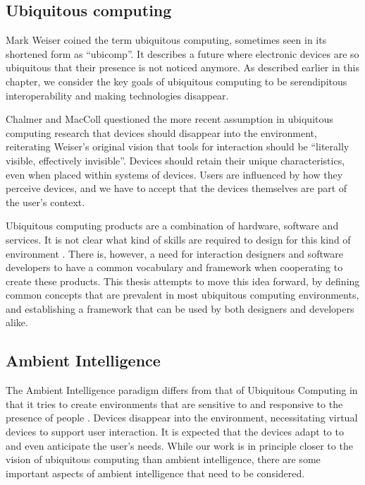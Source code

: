 \subsection{Ubiquitous computing}
 
Mark Weiser \cite{Weiser1991} coined the term ubiquitous computing, sometimes seen in its shortened form as ``ubicomp''. It describes a future where electronic devices are so ubiquitous that their presence is not noticed anymore. As described earlier in this chapter, we consider the key goals of ubiquitous computing to be serendipitous interoperability and making technologies disappear.

Chalmer and MacColl \cite{Chalmers2003} questioned the more recent assumption in ubiquitous computing research that devices should disappear into the environment, reiterating Weiser's original vision that tools for interaction should be ``literally visible, effectively invisible''. Devices should retain their unique characteristics, even when placed within systems of devices. Users are influenced by how they perceive devices, and we have to accept that the devices themselves are part of the user's context.

Ubiquitous computing products are a combination of hardware, software and services. It is not clear what kind of skills are required to design for this kind of environment \cite{Kuniavsky}. There is, however, a need for interaction designers and software developers to have a common vocabulary and framework when cooperating to create these products. This thesis attempts to move this idea forward, by defining common concepts that are prevalent in most ubiquitous computing environments, and establishing a framework that can be used by both designers and developers alike.

\subsection{Ambient Intelligence}
The Ambient Intelligence paradigm differs from that of Ubiquitous Computing in that it tries to create environments that are sensitive  to and responsive to the presence of people \cite{Aarts2004}. Devices disappear into the environment, necessitating virtual devices to support user interaction. It is expected that the devices adapt to to and even anticipate the user's needs. While our work is in principle closer to the vision of ubiquitous computing than ambient intelligence, there are some important aspects of ambient intelligence that need to be considered.

